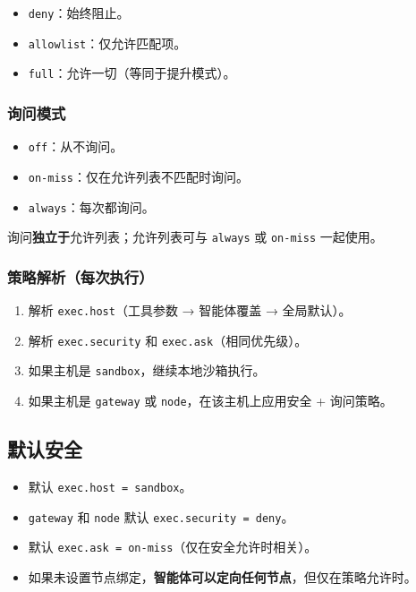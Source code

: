 \begin{itemize}
  \item \texttt{deny}：始终阻止。
  \item \texttt{allowlist}：仅允许匹配项。
  \item \texttt{full}：允许一切（等同于提升模式）。
\end{itemize}


\subsubsection{询问模式}


\begin{itemize}
  \item \texttt{off}：从不询问。
  \item \texttt{on-miss}：仅在允许列表不匹配时询问。
  \item \texttt{always}：每次都询问。
\end{itemize}


询问\textbf{独立于}允许列表；允许列表可与 \texttt{always} 或 \texttt{on-miss} 一起使用。

\subsubsection{策略解析（每次执行）}


\begin{enumerate}
  \item 解析 \texttt{exec.host}（工具参数 → 智能体覆盖 → 全局默认）。
  \item 解析 \texttt{exec.security} 和 \texttt{exec.ask}（相同优先级）。
  \item 如果主机是 \texttt{sandbox}，继续本地沙箱执行。
  \item 如果主机是 \texttt{gateway} 或 \texttt{node}，在该主机上应用安全 + 询问策略。
\end{enumerate}


\subsection{默认安全}


\begin{itemize}
  \item 默认 \texttt{exec.host = sandbox}。
  \item \texttt{gateway} 和 \texttt{node} 默认 \texttt{exec.security = deny}。
  \item 默认 \texttt{exec.ask = on-miss}（仅在安全允许时相关）。
  \item 如果未设置节点绑定，\textbf{智能体可以定向任何节点}，但仅在策略允许时。
\end{itemize}


